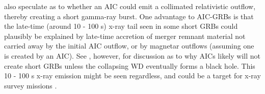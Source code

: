 \citeauthor{metz+09} also speculate as to whether an AIC could emit a collimated relativistic outflow, thereby creating a short gamma-ray burst.  One advantage to AIC-GRBs is that the late-time (around 10 - 100 s) x-ray tail seen in some short GRBs could plausibly be explained by late-time accretion of merger remnant material not carried away by the initial AIC outflow, or by magnetar outflows (assuming one is created by an AIC).  See \cite{dess+07}, however, for discussion as to why AICs likely will not create short GRBs unless the collapsing WD eventually forms a black hole.  This 10 - 100 s x-ray emission might be seen regardless, and could be a target for x-ray survey missions \citep{metz+09}.


